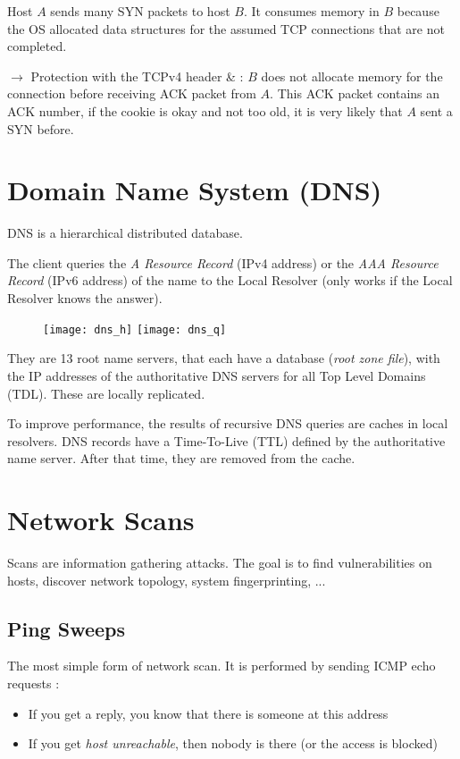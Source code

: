 Host $A$ sends many SYN packets to host $B$. It consumes memory in $B$ because the OS allocated data structures for the assumed TCP connections that are not completed. 

$\rightarrow$ Protection with the TCPv4 header \&  : $B$ does not allocate memory for the connection before receiving ACK packet from $A$. This ACK packet contains an ACK number, if the cookie is okay and not too old, it is very likely that $A$ sent a SYN before.

\chapter{Domain Name System (DNS)}

DNS is a hierarchical distributed database.

The client queries the \textit{A Resource Record} (IPv4 address) or the \textit{AAA Resource Record} (IPv6 address) of the name to the Local Resolver (only works if the Local Resolver knows the answer).

\begin{figure}[H]
    \centering
    \texttt{[image: dns\_h]}\hfill
    \texttt{[image: dns\_q]}
\end{figure}

They are 13 root name servers, that each have a database (\textit{root zone file}), with the IP addresses of the authoritative DNS servers for all Top Level Domains (TDL). These are locally replicated.

To improve performance, the results of recursive DNS queries are caches in local resolvers. DNS records have a Time-To-Live (TTL) defined by the authoritative name server. After that time, they are removed from the cache.

\chapter{Network Scans}

Scans are information gathering attacks. The goal is to find vulnerabilities on hosts, discover network topology, system fingerprinting, ...

\section{Ping Sweeps}

The most simple form of network scan. It is performed by sending ICMP echo requests :
\begin{itemize}
    \item If you get a reply, you know that there is someone at this address
    \item If you get \textit{host unreachable}, then nobody is there (or the access is blocked)
\end{itemize}

